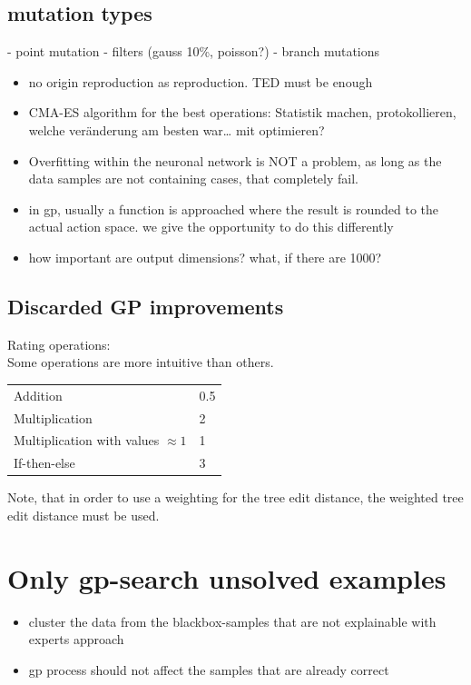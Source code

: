 \subsection{mutation types}
- point mutation
- filters (gauss 10\%, poisson?)
- branch mutations

\begin{itemize}
    \item no origin reproduction as reproduction. TED must be enough
    \item CMA-ES algorithm for the best operations:
    Statistik machen, protokollieren, welche veränderung am besten war… mit optimieren?
    \item Overfitting within the neuronal network is NOT a problem, as long as the data samples are not containing cases, that completely fail.
    \item in gp, usually a function is approached where the result is rounded to the actual action space. we give the opportunity to do this differently
    \item how important are output dimensions? what, if there are 1000?

\end{itemize}


\subsection{Discarded GP improvements}

Rating operations:\\
Some operations are more intuitive than others.

\begin{tabular}{l l}
     Addition & 0.5 \\
     Multiplication & 2\\
     Multiplication with values $\approx 1$ & 1\\
     If-then-else & 3\\
     
\end{tabular}

Note, that in order to use a weighting for the tree edit distance, the weighted tree edit distance must be used.

\section{Only gp-search unsolved examples}

\begin{itemize}
    \item cluster the data from the blackbox-samples that are not explainable with experts approach
    \item gp process should not affect the samples that are already correct 
\end{itemize}

